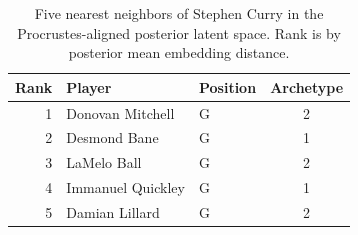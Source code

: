 \begin{table}[htbp]
  \centering\small
  \begin{tabular}{rllc}
    \toprule
    Rank & Player & Position & Archetype \\
    \midrule
    1 & Donovan Mitchell & G & 2 \\
    2 & Desmond Bane & G & 1 \\
    3 & LaMelo Ball & G & 2 \\
    4 & Immanuel Quickley & G & 1 \\
    5 & Damian Lillard & G & 2 \\
    \bottomrule
  \end{tabular}
  \caption{Five nearest neighbors of Stephen Curry in the Procrustes-aligned posterior latent space. Rank is by posterior mean embedding distance.}
  \label{tab:Stephen_Curry_neighbors}
\end{table}

